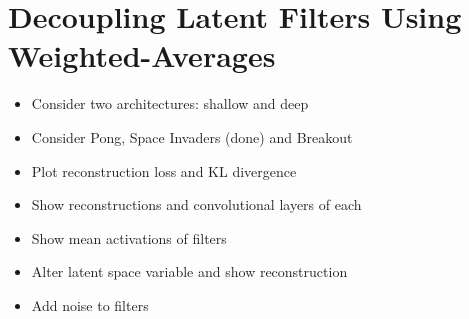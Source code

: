 %
%
%
%
%
\section{Decoupling Latent Filters Using Weighted-Averages}
\begin{itemize}
\item Consider two architectures: shallow and deep
\item Consider Pong, Space Invaders (done) and Breakout
\item Plot reconstruction loss and KL divergence
\item Show reconstructions and convolutional layers of each
\item Show mean activations of filters
\item Alter latent space variable and show reconstruction
\item Add noise to filters
\end{itemize}



